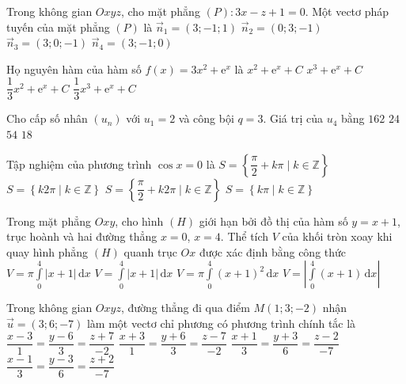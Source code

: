 \begin{ex}%
	Trong không gian $Oxyz$, cho mặt phẳng $(P)\colon 3x-z+1=0$. Một vectơ pháp tuyến của mặt phẳng $(P)$ là
	\choice
	{$\vec{n}_1=(3;-1;1)$}
	{$\vec{n}_2=(0;3;-1)$}
	{\True $\vec{n}_3=(3;0;-1)$}
	{$\vec{n}_4=(3;-1;0)$}
\end{ex}
\begin{ex}%
	Họ nguyên hàm của hàm số $f(x)=3x^2+\mathrm{e}^x$ là
	\choice
	{$x^2+\mathrm{e}^x+C$}
	{\True $x^3+\mathrm{e}^x+C$}
	{$\dfrac{1}{3}x^2+\mathrm{e}^x+C$}
	{$\dfrac{1}{3}x^3+\mathrm{e}^x+C$}
\end{ex}
\begin{ex}%
	Cho cấp số nhân $(u_n)$ với $u_1=2$ và công bội $q=3$. Giá trị của $u_4$ bằng
	\choice
	{$162$}
	{$24$}
	{\True $54$}
	{$18$}
\end{ex}
\begin{ex}%
	Tập nghiệm của phương trình $\cos x=0$ là
	\choice
	{\True $S=\left\{\dfrac{\pi}{2}+k \pi \mid k \in \mathbb{Z}\right\}$}
	{$S=\left\{k 2 \pi \mid k \in \mathbb{Z}\right\}$}
	{$S=\left\{\dfrac{\pi}{2}+k2 \pi \mid k \in \mathbb{Z}\right\}$}
	{$S=\left\{ k \pi \mid k \in \mathbb{Z}\right\}$}
\end{ex}
\begin{ex}%
	Trong mặt phẳng $Oxy$, cho hình $(H)$ giới hạn bởi đồ thị của hàm số $y=x+1$, trục hoành và hai đường thẳng $x=0$, $x=4$. Thể tích $V$ của khối tròn xoay khi quay hình phẳng $(H)$ quanh trục $Ox$ được xác định bằng công thức
	\choice
	{$V=\pi \displaystyle\int\limits_0^4 \left|x+1\right| \mathrm{\,d}x$}
	{$V=\displaystyle\int\limits_0^4 \left|x+1\right| \mathrm{\,d}x$}
	{\True $V=\pi \displaystyle\int\limits_0^4(x+1)^2 \mathrm{\,d}x$}
	{$V=\left|\displaystyle\int\limits_0^4(x+1) \mathrm{\,d}x\right|$}
\end{ex}
\begin{ex}%
	Trong không gian $Oxyz$, đường thẳng đi qua điểm $M(1;3;-2)$ nhận $\overrightarrow{u}=(3;6;-7)$ làm một vectơ chỉ phương có phương trình chính tắc là
	\choice
	{$\dfrac{x-3}{1}=\dfrac{y-6}{3}=\dfrac{z+7}{-2}$}
	{$\dfrac{x+3}{1}=\dfrac{y+6}{3}=\dfrac{z-7}{-2}$}
	{$\dfrac{x+1}{3}=\dfrac{y+3}{6}=\dfrac{z-2}{-7}$}
	{\True $\dfrac{x-1}{3}=\dfrac{y-3}{6}=\dfrac{z+2}{-7}$}
\end{ex}
